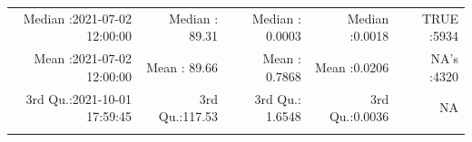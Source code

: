 \documentclass[
  10pt,
  a4paper,oneside]{article}
\begin{document}
\begin{longtable}[]{@{}rrrrr@{}}
\begin{minipage}[t]{0.26\columnwidth}\raggedleft
Median :2021-07-02 12:00:00\strut
\end{minipage} & \begin{minipage}[t]{0.15\columnwidth}\raggedleft
Median : 89.31\strut
\end{minipage} & \begin{minipage}[t]{0.16\columnwidth}\raggedleft
Median : 0.0003\strut
\end{minipage} & \begin{minipage}[t]{0.15\columnwidth}\raggedleft
Median :0.0018\strut
\end{minipage} & \begin{minipage}[t]{0.15\columnwidth}\raggedleft
TRUE :5934\strut
\end{minipage}\tabularnewline
\begin{minipage}[t]{0.26\columnwidth}\raggedleft
Mean :2021-07-02 12:00:00\strut
\end{minipage} & \begin{minipage}[t]{0.15\columnwidth}\raggedleft
Mean : 89.66\strut
\end{minipage} & \begin{minipage}[t]{0.16\columnwidth}\raggedleft
Mean : 0.7868\strut
\end{minipage} & \begin{minipage}[t]{0.15\columnwidth}\raggedleft
Mean :0.0206\strut
\end{minipage} & \begin{minipage}[t]{0.15\columnwidth}\raggedleft
NA's :4320\strut
\end{minipage}\tabularnewline
\begin{minipage}[t]{0.26\columnwidth}\raggedleft
3rd Qu.:2021-10-01 17:59:45\strut
\end{minipage} & \begin{minipage}[t]{0.15\columnwidth}\raggedleft
3rd Qu.:117.53\strut
\end{minipage} & \begin{minipage}[t]{0.16\columnwidth}\raggedleft
3rd Qu.: 1.6548\strut
\end{minipage} & \begin{minipage}[t]{0.15\columnwidth}\raggedleft
3rd Qu.:0.0036\strut
\end{minipage} & \begin{minipage}[t]{0.15\columnwidth}\raggedleft
NA\strut
\end{minipage}\tabularnewline
\begin{minipage}[t]{0.26\columnwidth}\raggedleft

\end{minipage}
\end{longtable}
\end{document}
